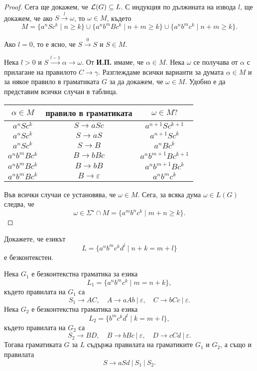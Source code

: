 \begin{proof}
  Сега ще докажем, че $\mathcal{L}(G) \subseteq L$.
  С индукция по дължината на извода $l$,
  ще докажем, че ако $S \stackrel{l}{\rightarrow}\omega$, то $\omega \in M$, където
  \[M = \{a^nSc^k\mid n\geq k\}\cup\{a^nb^mBc^k\mid n+m\geq k\}\cup\{a^nb^mc^k\mid n+m\geq k\}.\]
  
  Ако $l = 0$, то е ясно, че $S \stackrel{0}{\rightarrow} S$ и $S \in M$.

  Нека $l > 0$ и $S \stackrel{l-1}{\rightarrow} \alpha \rightarrow \omega$.
  От {\bf И.П.} имаме, че $\alpha \in M$. Нека $\omega$ се получава от $\alpha$ с прилагане на правилото $C \rightarrow \gamma$.
  Разглеждаме всички варианти за думата $\alpha \in M$ и за някое правило в граматиката $G$
  за да докажем, че  $\omega \in M$.
  Удобно е да представим всички случаи в таблица.
  \begin{center}
    \begin{tabular}{| c | c | c |}
      \hline
      $\alpha\in M$ & правило в граматиката & $\omega \in M?$ \\ \hline
      $a^nSc^k$ & $S \rightarrow aSc$ & $a^{n+1}Sc^{k+1}$ \\ \hline
      $a^nSc^k$ & $S \rightarrow aS$ & $a^{n+1}Sc^{k}$ \\ \hline
      $a^nSc^k$ & $S \rightarrow B$ & $a^{n}Bc^{k}$ \\ \hline
      $a^nb^mBc^k$ & $B \rightarrow bBc$ & $a^nb^{m+1}Bc^{k+1}$\\ \hline
      $a^nb^mBc^k$ & $B \rightarrow bB$ & $a^nb^{m+1}Bc^{k}$\\ \hline
      $a^nb^mBc^k$ & $B \rightarrow \varepsilon$ & $a^nb^{m}c^{k}$\\ \hline
    \end{tabular}
  \end{center}
  Във всички случаи се установява, че $\omega \in M$.
  Сега, за всяка дума $\omega \in L(G)$ следва, че
  \[\omega \in \Sigma^\star \cap M = \{a^mb^nc^k\mid m+n \geq k\}.\]
\end{proof}

\begin{problem}
  Докажете, че езикът 
  \[L = \{a^nb^mc^kd^l \mid n+k = m + l\}\]
  е безконтекстен.
\end{problem}
\begin{hint}
  Нека $G_1$ е безконтекстна граматика за езика
  \[L_1 = \{a^nb^mc^k \mid m = n+k\},\]
  където правилата на $G_1$ са
  \[S_1 \to AC,\quad  A \to aAb\ |\ \varepsilon,\quad C \to bCc\ |\ \varepsilon.\]
  Нека $G_2$ е безконтекстна граматика за езика 
  \[L_2 = \{b^mc^kd^l \mid k = m+l\},\]
  където правилата на $G_2$ са
  \[S_2 \to BD,\quad B \to bBc\ |\ \varepsilon,\quad D \to cCd\ |\ \varepsilon.\]
  Тогава граматиката $G$ за $L$ 
  съдържа правилата на граматиките $G_1$ и $G_2$, а също и правилата
  \[S \to aSd\ |\ S_1\ |\ S_2.\]
\end{hint}

